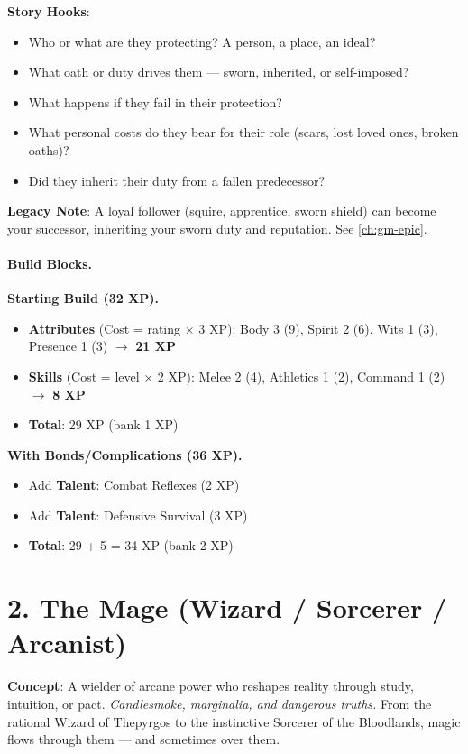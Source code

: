 \textbf{Story Hooks}:
\begin{itemize}
\item Who or what are they protecting? A person, a place, an ideal?
\item What oath or duty drives them --- sworn, inherited, or self-imposed?
\item What happens if they fail in their protection?
\item What personal costs do they bear for their role (scars, lost loved ones, broken oaths)?
\item Did they inherit their duty from a fallen predecessor?
\end{itemize}

\textbf{Legacy Note}: A loyal follower (squire, apprentice, sworn shield) can become your successor, inheriting your sworn duty and reputation. See \ref{ch:gm-epic}.

\paragraph{Build Blocks.}
\textbf{Starting Build (32 XP).}
\begin{itemize}
\item \textbf{Attributes} (Cost = rating \(\times\) 3 XP): Body 3 (9), Spirit 2 (6), Wits 1 (3), Presence 1 (3) \(\rightarrow\) \textbf{21 XP}
\item \textbf{Skills} (Cost = level \(\times\) 2 XP): Melee 2 (4), Athletics 1 (2), Command 1 (2) \(\rightarrow\) \textbf{8 XP}
\item \textbf{Total}: 29 XP (bank 1 XP)
\end{itemize}
\textbf{With Bonds/Complications (36 XP).}
\begin{itemize}
\item Add \textbf{Talent}: Combat Reflexes (2 XP)
\item Add \textbf{Talent}: Defensive Survival (3 XP)
\item \textbf{Total}: 29 + 5 = 34 XP (bank 2 XP)
\end{itemize}

\section{2. The Mage (Wizard / Sorcerer / Arcanist)}
\label{sec:concept-mage}

\textbf{Concept}: A wielder of arcane power who reshapes reality through study, intuition, or pact. \emph{Candlesmoke, marginalia, and dangerous truths.} From the rational Wizard of Thepyrgos to the instinctive Sorcerer of the Bloodlands, magic flows through them --- and sometimes over them.

